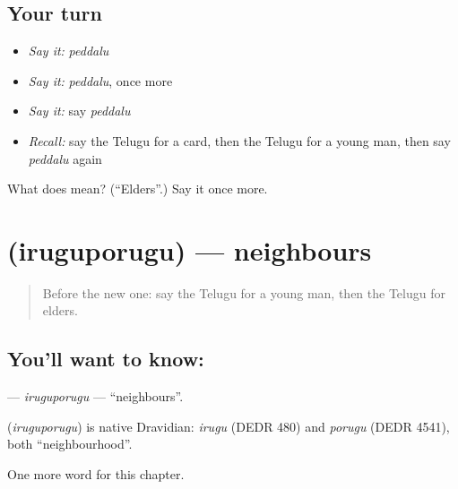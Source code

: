 \subsection*{Your turn}
\begin{itemize}
\raggedright
  \item \emph{Say it:} \emph{peddalu}
  \item \emph{Say it:} \emph{peddalu}, once more
  \item \emph{Say it:} say \emph{peddalu}
  \item \emph{Recall:} say the Telugu for a card, then the Telugu for a young man, then say \emph{peddalu} again
\end{itemize}

\begin{tcolorbox}[breakable,colback=teal!4,colframe=teal!35!black,title={Before you move on}]
What does  mean? (\textquotedblleft{}Elders\textquotedblright{}.) Say it once more.
\end{tcolorbox}
\section[\texorpdfstring{\te{ఇరుగుపొరుగు} (iruguporugu)}{ఇరుగుపొరుగు (iruguporugu)}]{ (iruguporugu) — neighbours}

\label{lesson:TE-C227-iruguporugu}



\begin{quote}
Before the new one: say the Telugu for a young man, then the Telugu for elders.
\end{quote}

\subsection*{You'll want to know: }
\textbf{} — \emph{iruguporugu} — \textquotedblleft{}neighbours\textquotedblright{}.

\begin{cousinweb}
\textbf{} (\emph{iruguporugu}) is native Dravidian: \emph{irugu} (DEDR 480) and \emph{porugu} (DEDR 4541), both \textquotedblleft{}neighbourhood\textquotedblright{}.
\end{cousinweb}

\begin{grammarlens}[title={What you've built}]
One more word for this chapter.
\end{grammarlens}

